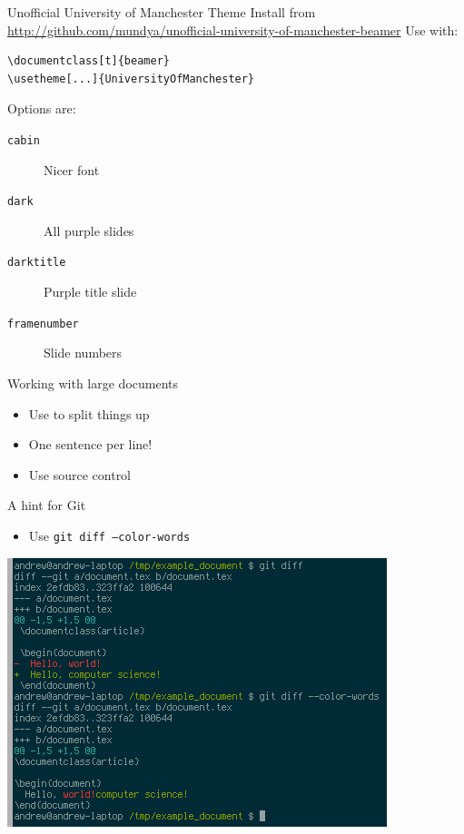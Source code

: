 \documentclass[t]{beamer}
\begin{document}
\begin{frame}{Unofficial University of Manchester Theme}
  Install from \url{http://github.com/mundya/unofficial-university-of-manchester-beamer}
\vfill
  Use with:
  \begin{verbatim}
\documentclass[t]{beamer}
\usetheme[...]{UniversityOfManchester}
  \end{verbatim}
\vfill
  Options are:
  \begin{description}
    \item[\texttt{cabin}] Nicer font
    \item[\texttt{dark}] All purple slides
    \item[\texttt{darktitle}] Purple title slide
    \item[\texttt{framenumber}] Slide numbers
  \end{description}
\end{frame}

\begin{frame}{Working with large documents}
  \begin{itemize}
    \item Use \texttt{} to split things up
    \item One sentence per line!
    \item Use source control
  \end{itemize}
\end{frame}

\begin{frame}[plain]{A hint for Git}
  \begin{itemize}
    \item Use \texttt{git diff --color-words}
  \end{itemize}
  \includegraphics[width=\textwidth]{git_diff}
\end{frame}
\end{document}

